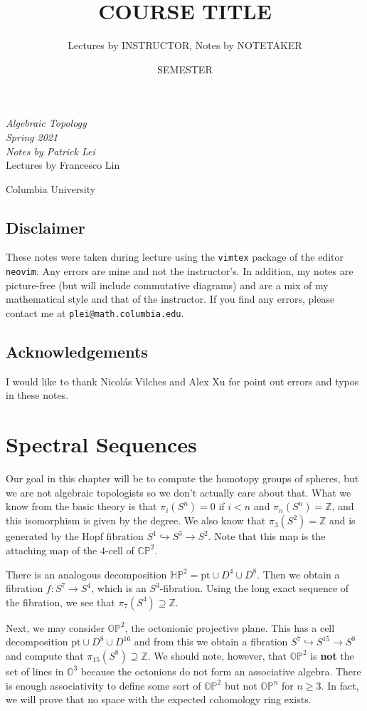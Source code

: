 \documentclass[leqno, openany]{memoir}
\title{COURSE TITLE}
\author{Lectures by INSTRUCTOR, Notes by NOTETAKER}
\date{SEMESTER}
\theoremstyle{definition}
\theoremstyle{remark}
\theoremstyle{plain}
\theoremstyle{definition}
\theoremstyle{remark}
\renewcommand{\H}{\mathbb{H}}
\newcommand{\C}{\mathbb{C}}
\newcommand{\Z}{\mathbb{Z}}
\renewcommand{\P}{\mathbb{P}}
\newcommand{\mr}[1]{\mathrm{#1}}
\newcommand*{\titleSW}
    {\begingroup%
    \raggedleft
    \vspace*{\baselineskip}
    {\Huge\itshape Algebraic Topology \\ Spring 2021}\\[\baselineskip]
    {\large\itshape Notes by Patrick Lei}\\[0.2\textheight]
    {\Large Lectures by Francesco Lin}\par
    \vfill
    {\Large \sffamily Columbia University}
    \vspace*{\baselineskip}
\endgroup}
\begin{document}
    
\begin{titlingpage}
\titleSW
\end{titlingpage}

\thispagestyle{empty}
\section*{Disclaimer}%
\label{sec:disclaimer}

These notes were taken during lecture using the \texttt{vimtex} package of the editor \texttt{neovim}. 
Any errors are mine and not the instructor's. 
In addition, my notes are picture-free (but will include commutative diagrams) and are a mix of my mathematical style and that of the instructor.
If you find any errors, please contact me at \texttt{plei@math.columbia.edu}.

\section*{Acknowledgements}%
\label{sec:acknowledgements}

I would like to thank Nicol\'as Vilches and Alex Xu for point out errors and typos in these notes.


\newpage


\tableofcontents

\chapter{Spectral Sequences}%
\label{cha:spectral_sequences}

Our goal in this chapter will be to compute the homotopy groups of spheres, but we are not algebraic topologists so we don't actually care about that. What we know from the basic theory is that $\pi_i(S^n) = 0$ if $i < n$ and $\pi_n(S^n) = \Z$, and this isomorphism is given by the degree. We also know that $\pi_3(S^2) = \Z$ and is generated by the Hopf fibration $S^1 \hookrightarrow S^3 \to S^2$. Note that this map is the attaching map of the $4$-cell of $\C\P^2$.

There is an analogous decomposition $\H\P^2 = \mr{pt} \cup D^4 \cup D^8$. Then we obtain a fibration $f \colon S^7 \to S^4$, which is an $S^3$-fibration. Using the long exact sequence of the fibration, we see that $\pi_7(S^4) \supseteq \Z$.

Next, we may consider $\mathbb{O}\P^2$, the octonionic projective plane. This has a cell decomposition $\mr{pt} \cup D^8 \cup D^{16}$ and from this we obtain a fibration $S^7 \hookrightarrow S^{15} \to S^8$ and compute that $\pi_{15}(S^8) \supseteq \Z$. We should note, however, that $\mathbb{O}\P^2$ is \textbf{not} the set of lines in $\mathbb{O}^3$ because the octonions do not form an associative algebra. There is enough associativity to define some sort of $\mathbb{O}\P^2$ but not $\mathbb{O}\P^n$ for $n \geq 3$. In fact, we will prove that no space with the expected cohomology ring exists.
\end{document}
